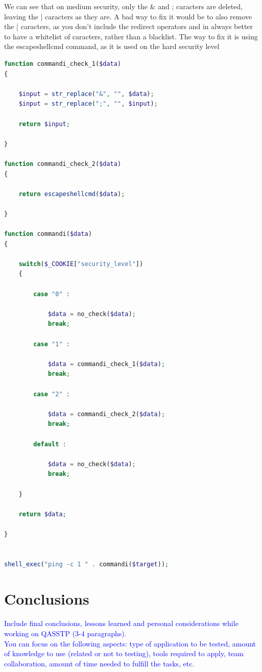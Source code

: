 \documentclass{article}
\begin{document}
We can see that on medium security, only the \& and ; caracters are deleted, leaving the | caracters as they are.
A bad way to fix it would be to also remove the | caracters, as you don't include the redirect operators and in always better to have a whitelist of caracters, rather than a blacklist.
The way to fix it is using the escapeshellcmd command, as it is used on the hard security level
\begin{lstlisting}[language=php,caption={Backdoor Code},label=php:command-injection-code]
function commandi_check_1($data)
{
    
    $input = str_replace("&", "", $data);
    $input = str_replace(";", "", $input);
    
    return $input;
    
}

function commandi_check_2($data)
{
   
    return escapeshellcmd($data);
    
}

function commandi($data)
{

    switch($_COOKIE["security_level"])
    {

        case "0" :

            $data = no_check($data);
            break;

        case "1" :

            $data = commandi_check_1($data);
            break;

        case "2" :

            $data = commandi_check_2($data);
            break;

        default :

            $data = no_check($data);
            break;

    }

    return $data;

}


shell_exec("ping -c 1 " . commandi($target));
\end{lstlisting}


\section{Conclusions}
\label{}

\textcolor{blue}{Include final conclusions, lessons learned and personal considerations while working on QASSTP (3-4 paragraphs).\\
    You can focus on the following aspects: type of application to be tested, amount of knowledge to use (related or not to testing), tools required to apply, team collaboration, amount of time needed to fulfill the tasks, etc.}
\end{document}
